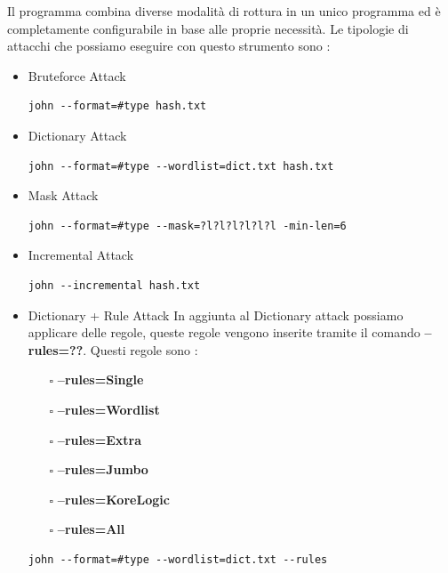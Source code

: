 Il programma combina diverse modalità di rottura in un unico programma ed è completamente configurabile in base alle proprie necessità.
\newpage
Le tipologie di attacchi che possiamo eseguire con questo strumento sono :
\begin{itemize}
    \item Bruteforce Attack \newline
          \begin{lstlisting}[caption={John the ripper Bruteforce}, style=javaScriptCode]
        john --format=#type hash.txt
    \end{lstlisting}
    \item Dictionary Attack \newline
          \begin{lstlisting}[caption={John the ripper Dictionary}, style=javaScriptCode]
        john --format=#type --wordlist=dict.txt hash.txt
    \end{lstlisting}
    \item Mask Attack \newline
          \begin{lstlisting}[caption={John the ripper Mask}, style=javaScriptCode]
        john --format=#type --mask=?l?l?l?l?l?l -min-len=6
    \end{lstlisting}
    \item Incremental Attack \newline
          \begin{lstlisting}[caption={John the ripper Incremental}, style=javaScriptCode]
        john --incremental hash.txt
    \end{lstlisting}
    \item Dictionary + Rule Attack \newline
          In aggiunta al Dictionary attack possiamo applicare delle regole, queste regole vengono inserite tramite il comando \textbf{--rules=??}.\newline
          Questi regole sono :
          \begin{itemize}
              \item[$\square$] \textbf{--rules=Single}
              \item[$\square$] \textbf{--rules=Wordlist}
              \item[$\square$] \textbf{--rules=Extra}
              \item[$\square$] \textbf{--rules=Jumbo}
              \item[$\square$] \textbf{--rules=KoreLogic}
              \item[$\square$] \textbf{--rules=All}
          \end{itemize}
          \begin{lstlisting}[caption={John the ripper Dictionary + Rule }, style=javaScriptCode]
        john --format=#type --wordlist=dict.txt --rules
    \end{lstlisting}
\end{itemize}

